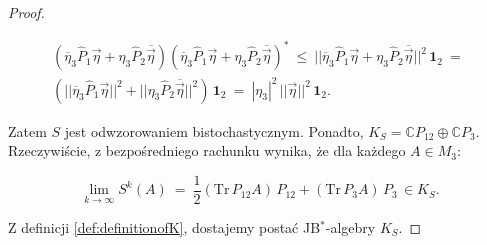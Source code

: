 {\begin{proof}
\begin{linenomath*}
 \begin{multline}
   \left ( \overline{\eta}_{3} \hat{P}_{1} \vec{\eta} +
    \eta_{3} \hat{P}_{2} \overline{\vec{\eta}} \right)
   \left ( \overline{\eta}_{3} \hat{P}_{1} \vec{\eta} +
    \eta_{3} \hat{P}_{2} \overline{\vec{\eta}} \right)^{*} \: \leq \:
|| \overline{\eta}_{3} \hat{P}_{1} \vec{\eta} +
    \eta_{3} \hat{P}_{2}\overline{\vec{\eta}} ||^{2} \, \mathbf{1}_{2}
    \: = \: \\
\left( || \overline{\eta}_{3} \hat{P}_{1} \vec{\eta} ||^{2} +
    || \eta_{3} \hat{P}_{2} \overline{\vec{\eta}} ||^{2} \right) \, \mathbf{1}_{2}
    \: = \:
|\eta_{3}|^{2} \, ||\vec{\eta}||^{2} \, \mathbf{1}_{2}.
 \end{multline}
\end{linenomath*}
Zatem $S$ jest odwzorowaniem bistochastycznym.
Ponadto,
$K_{S}= \mathbb{C} P_{12} \oplus \mathbb{C} P_{3}$.
Rzeczywiście,
z bezpośredniego rachunku wynika, że dla każdego $A \in M_{3}$:
\begin{linenomath*}
 \begin{equation}
\lim \limits_{k \rightarrow \infty} S^{k}(A) \:=\:
\frac{1}{2} (\text{Tr} \, P_{12} A )\, P_{12} +
    (\text{Tr} \, P_{3} A)\, P_{3} \, \in K_{S}.
 \end{equation}
\end{linenomath*}
Z definicji \eqref{def:definitionofK},
dostajemy postać JB$^{*}$-algebry $K_{S}$.


\end{proof}}
